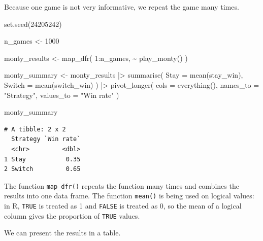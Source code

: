 \documentclass[
  letterpaper,
  DIV=11,
  numbers=noendperiod]{scrreprt}
\newenvironment{Shaded}{\begin{snugshade}}{\end{snugshade}}
\newcommand{\AttributeTok}[1]{\textcolor[rgb]{0.40,0.45,0.13}{#1}}
\newcommand{\DecValTok}[1]{\textcolor[rgb]{0.68,0.00,0.00}{#1}}
\newcommand{\FunctionTok}[1]{\textcolor[rgb]{0.28,0.35,0.67}{#1}}
\newcommand{\NormalTok}[1]{\textcolor[rgb]{0.00,0.23,0.31}{#1}}
\newcommand{\OtherTok}[1]{\textcolor[rgb]{0.00,0.23,0.31}{#1}}
\newcommand{\SpecialCharTok}[1]{\textcolor[rgb]{0.37,0.37,0.37}{#1}}
\newcommand{\StringTok}[1]{\textcolor[rgb]{0.13,0.47,0.30}{#1}}
\begin{document}
Because one game is not very informative, we repeat the game many times.

\begin{Shaded}
\begin{Highlighting}[]
\FunctionTok{set.seed}\NormalTok{(}\DecValTok{24205242}\NormalTok{)}

\NormalTok{n\_games }\OtherTok{\textless{}{-}} \DecValTok{1000}

\NormalTok{monty\_results }\OtherTok{\textless{}{-}} \FunctionTok{map\_dfr}\NormalTok{(}
  \DecValTok{1}\SpecialCharTok{:}\NormalTok{n\_games,}
  \SpecialCharTok{\textasciitilde{}} \FunctionTok{play\_monty}\NormalTok{()}
\NormalTok{)}

\NormalTok{monty\_summary }\OtherTok{\textless{}{-}}\NormalTok{ monty\_results }\SpecialCharTok{|\textgreater{}}
  \FunctionTok{summarise}\NormalTok{(}
    \StringTok{\textasciigrave{}}\AttributeTok{Stay}\StringTok{\textasciigrave{}} \OtherTok{=} \FunctionTok{mean}\NormalTok{(stay\_win),}
    \StringTok{\textasciigrave{}}\AttributeTok{Switch}\StringTok{\textasciigrave{}} \OtherTok{=} \FunctionTok{mean}\NormalTok{(switch\_win)}
\NormalTok{  ) }\SpecialCharTok{|\textgreater{}}
  \FunctionTok{pivot\_longer}\NormalTok{(}
    \AttributeTok{cols =} \FunctionTok{everything}\NormalTok{(),}
    \AttributeTok{names\_to =} \StringTok{"Strategy"}\NormalTok{,}
    \AttributeTok{values\_to =} \StringTok{"Win rate"}
\NormalTok{  )}

\NormalTok{monty\_summary}
\end{Highlighting}
\end{Shaded}

\begin{verbatim}
# A tibble: 2 x 2
  Strategy `Win rate`
  <chr>         <dbl>
1 Stay           0.35
2 Switch         0.65
\end{verbatim}

The function \texttt{map\_dfr()} repeats the function many times and
combines the results into one data frame. The function \texttt{mean()}
is being used on logical values: in R, \texttt{TRUE} is treated as 1 and
\texttt{FALSE} is treated as 0, so the mean of a logical column gives
the proportion of \texttt{TRUE} values.

We can present the results in a table.

\begin{table}

\caption{\label{tbl-monty-simulation}Simulated win rates for staying and
switching in the Monty Hall problem}


\end{table}%
\end{document}
